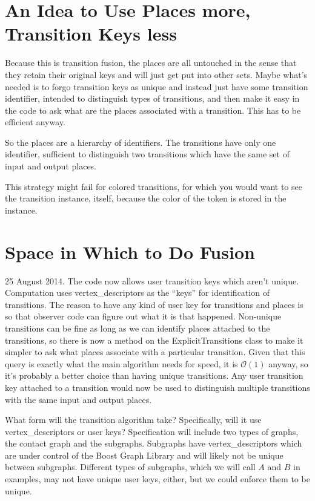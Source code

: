 \documentclass{article}
\begin{document}
\section{An Idea to Use Places more, Transition Keys less}
Because this is transition fusion, the places are all untouched
in the sense that they retain their original keys and will just
get put into other sets. Maybe what's needed is to forgo transition
keys as unique and instead just have some transition identifier,
intended to distinguish types of transitions, and then make it
easy in the code to ask what are the places associated with a transition.
This has to be efficient anyway.

So the places are a hierarchy of identifiers. The transitions have
only one identifier, sufficient to distinguish two transitions which
have the same set of input and output places.

This strategy might fail for colored transitions, for which
you would want to see the transition instance, itself, because
the color of the token is stored in the instance.

\section{Space in Which to Do Fusion}
25 August 2014.
The code now allows user transition keys which aren't unique.
Computation uses vertex\_descriptors as the ``keys'' for identification
of transitions. The reason to have any kind of user key for transitions
and places is so that observer code can figure out what it is that
happened. Non-unique transitions can be fine as long as we can identify
places attached to the transitions, so there is now a method on the
ExplicitTransitions class to make it simpler to ask what places associate
with a particular transition. Given that this query is exactly what
the main algorithm needs for speed, it is $\mathcal{O}(1)$ anyway, so it's
probably a better choice than having unique transitions. Any user transition
key attached to a transition would now be used to distinguish multiple
transitions with the same input and output places.

What form will the transition algorithm take? Specifically, will it use
vertex\_descriptors or user keys? Specification will include two
types of graphs, the contact graph and the subgraphs. Subgraphs
have vertex\_descriptors which are under control of the Boost Graph
Library and will likely not be unique between subgraphs. Different
types of subgraphs, which we will call $A$ and $B$ in examples, may
not have unique user keys, either, but we could enforce them to be unique.
\end{document}
